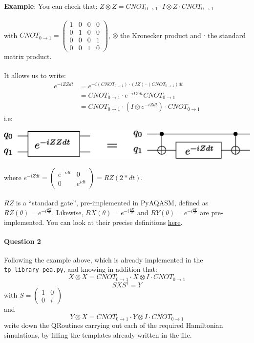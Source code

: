 \documentclass{article}
\begin{document}
\paragraph{}
\textbf{Example}:
You can check that: $Z\otimes Z = CNOT_{0\rightarrow 1} \cdot I\otimes Z \cdot CNOT_{0\rightarrow 1} $\\~\\
with $CNOT_{0\rightarrow 1}=\begin{pmatrix} 1 & 0 & 0 & 0 \\ 0 & 1 & 0 & 0 \\ 0 & 0 & 0 & 1 \\ 0 & 0 & 1 & 0 \end{pmatrix}$, $\otimes$
the Kronecker product and $\cdot$ the standard matrix product.\\~\\
It allows us to write: 
\begin{align*}
e^{-iZZdt} &= e^{-i(CNOT_{0\rightarrow 1})\cdot (IZ)\cdot (CNOT_{0\rightarrow 1})dt}\\ 
           &= CNOT_{0\rightarrow 1}\cdot e^{-iIZdt} CNOT_{0\rightarrow 1}\\
           &= CNOT_{0\rightarrow 1}\cdot \left(I\otimes e^{-iZdt}\right)\cdot CNOT_{0\rightarrow 1}
\end{align*}
i.e:
\begin{center}
\includegraphics[width=.5\textwidth]{zz_rz.eps}
\end{center}


where $e^{-iZdt} = \begin{pmatrix} e^{-idt} & 0 \\ 0 & e^{idt} \end{pmatrix} = RZ(2*dt)$.

\paragraph{} $RZ$ is a ``standard gate'', pre-implemented in PyAQASM, defined as $RZ(\theta)=e^{-i\frac{\theta Z}{2}}$.
Likewise, $RX(\theta) = e^{-i\frac{\theta X}{2}}$ and 
$RY(\theta)=e^{-i\frac{\theta Y}{2}}$ are pre-implemented. You can look at their precise definitions
\textcolor{blue}{\href{https://myqlm.github.io/aqasm.html\#aqasm}{here}}.

\paragraph{Question 2} Following the example above, which is already 
implemented in the {\tt tp\_library\_pea.py}, and knowing in addition that:
$$ X\otimes X = CNOT_{0\rightarrow 1} \cdot X\otimes I \cdot 
CNOT_{0\rightarrow 1}  $$
$$ SXS^{\dagger} = Y $$ with $S=\begin{pmatrix}1 & 0 \\ 0 & i \end{pmatrix}$ \\and 
$$ Y\otimes X = CNOT_{0\rightarrow 1} \cdot Y\otimes I \cdot 
CNOT_{0\rightarrow 1} $$
write down the QRoutines carrying out each of the required 
Hamiltonian simulations, by filling the templates already written
in the file. 
\end{document}
